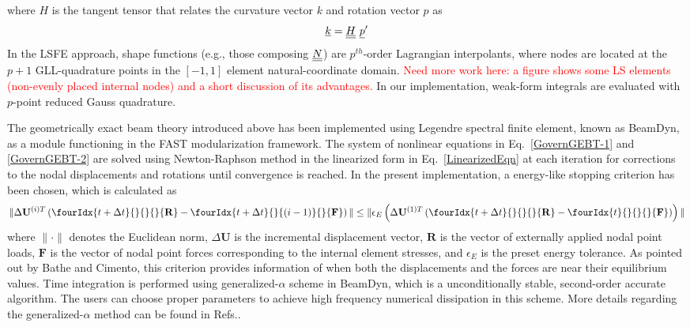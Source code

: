 where $H$ is the tangent tensor that relates the curvature vector $k$ and rotation vector $p$ as
\begin{equation}
    \label{Tensor}
    \underline{k} = \underline{\underline{H}}~ \underline{p}^\prime
\end{equation}
In the LSFE approach, shape functions (e.g., those composing $\underline{\underline{N}}$) are
$p^{th}$-order Lagrangian interpolants, where nodes are located at the $p+1$
GLL-quadrature points in the $[-1,1]$ element natural-coordinate domain.
\textcolor{red}{Need more work here: a figure shows some LS elements
(non-evenly placed internal nodes) and a short discussion of its
advantages.} In our implementation, weak-form integrals are evaluated with
$p$-point reduced Gauss quadrature.

The geometrically exact beam theory introduced above has been implemented using Legendre spectral finite element, known as BeamDyn, as a module functioning in the FAST modularization framework. The system of nonlinear equations in Eq.~\eqref{GovernGEBT-1} and \eqref{GovernGEBT-2} are solved using Newton-Raphson method in the linearized form in Eq.~\eqref{LinearizedEqn} at each iteration for corrections to the nodal displacements and rotations until convergence is reached. In the present implementation, a energy-like stopping criterion has been chosen, which is calculated as
\begin{equation}
    \label{StoppingCriterion}
    \| \Delta \mathbf{U}^{(i)T} \left( \fourIdx{t+\Delta t}{}{}{}{\mathbf{R}} -  \fourIdx{t+\Delta t}{}{(i-1)}{}{\mathbf{F}}  \right) \| \leq \| \epsilon_E \left( \Delta \mathbf{U}^{(1)T} \left( \fourIdx{t+\Delta t}{}{}{}{\mathbf{R}} - \fourIdx{t}{}{}{}{\mathbf{F}} \right) \right) \|
\end{equation}
where $\|\cdot\|$ denotes the Euclidean norm, $\Delta \mathbf{U}$ is the
incremental displacement vector, $\mathbf{R}$ is the vector of externally
applied nodal point loads, $\mathbf{F}$ is the vector of nodal point forces
corresponding to the internal element stresses, and $\epsilon_E$ is the
preset energy tolerance. As pointed out by Bathe and
Cimento\cite{Bathe-Cimento:1980}, this criterion provides information of
when both the displacements and the forces are near their equilibrium
values. Time integration is performed using generalized-$\alpha$ scheme in
BeamDyn, which is a unconditionally stable, second-order accurate algorithm.
The users can choose proper parameters to achieve high frequency numerical
dissipation in this scheme. More details regarding the generalized-$\alpha$
method can be found in Refs.\cite{Chung-Hulbert:1993,Bauchau:2010}. 


